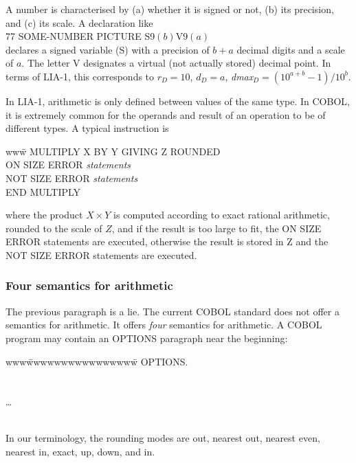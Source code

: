 \documentclass{article}
\begin{document}
A number is characterised by (a) whether it is signed or not,
(b) its precision, and (c) its scale.  A declaration like\\
77 SOME-NUMBER PICTURE S9$(b)$V$9(a)$\\
declares a signed variable (S) with a precision of $b+a$
decimal digits and a scale of $a$.  The letter V designates
a virtual (not actually stored) decimal point.  In terms of
LIA-1, this corresponds to $r_D = 10$, $d_D = a$,
{\it dmax}${}_D = (10^{a+b}-1)/10^b$.

In LIA-1, arithmetic is only defined between values of the
same type.  In COBOL, it is extremely common for the
operands and result of an operation to be of different types.
A typical instruction is
\begin{tabbing}
www\=\kill
MULTIPLY X BY Y GIVING Z ROUNDED\\
\> ON SIZE ERROR {\it statements}\\
\>  NOT SIZE ERROR {\it statements}\\
END MULTIPLY  
\end{tabbing}
\noindent where the product $X\times Y$ is computed
according to exact rational arithmetic, rounded to the
scale of $Z$, and if the result is too large to fit,
the ON SIZE ERROR statements are executed, otherwise
the result is stored in Z and the NOT SIZE ERROR
statements are executed.

\subsubsection{Four semantics for arithmetic}

The previous paragraph is a lie.  The current COBOL standard does not
offer a semantics for arithmetic.  It offers {\it four} semantics for
arithmetic.  A COBOL program may contain an OPTIONS paragraph near
the beginning:
\begin{tabbing}
www\=wwwwwwwwwwwwwwww\=\kill
OPTIONS.\\
\\
\\
\> \dots\\
\\
\end{tabbing}

In our terminology, the rounding modes are out, nearest out,
nearest even, nearest in, exact, up, down, and in.
\end{document}
